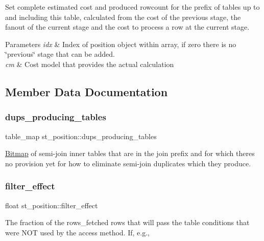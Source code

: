 Set complete estimated cost and produced rowcount for the prefix of tables up to and including this table, calculated from the cost of the previous stage, the fanout of the current stage and the cost to process a row at the current stage.


\begin{DoxyParams}{Parameters}
{\em idx} & Index of position object within array, if zero there is no \char`\"{}previous\char`\"{} stage that can be added. \\
\hline
{\em cm} & Cost model that provides the actual calculation \\
\hline
\end{DoxyParams}


\subsection{Member Data Documentation}
\mbox{\label{structst__position_a1dd4650de7dfd57c330261f9a0b583fe}} 
\subsubsection{\texorpdfstring{dups\+\_\+producing\+\_\+tables}{dups\_producing\_tables}}
{\footnotesize\ttfamily table\+\_\+map st\+\_\+position\+::dups\+\_\+producing\+\_\+tables}

\mbox{\hyperlink{classBitmap}{Bitmap}} of semi-\/join inner tables that are in the join prefix and for which there\textquotesingle{}s no provision yet for how to eliminate semi-\/join duplicates which they produce. \mbox{\label{structst__position_af2d5d5e5b65710d3a1a1ae38b14f44de}} 
\subsubsection{\texorpdfstring{filter\+\_\+effect}{filter\_effect}}
{\footnotesize\ttfamily float st\+\_\+position\+::filter\+\_\+effect}

The fraction of the \textquotesingle{}rows\+\_\+fetched\textquotesingle{} rows that will pass the table conditions that were N\+OT used by the access method. If, e.\+g.,

